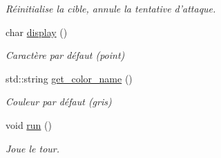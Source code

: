\begin{DoxyCompactItemize}
\begin{DoxyCompactList}\small\item\em Réinitialise la cible, annule la tentative d'attaque. \end{DoxyCompactList}\item 
\hypertarget{classColonized__planet_a1d3897c8ef1772fa9908fee7c5830f77}{char \hyperlink{classColonized__planet_a1d3897c8ef1772fa9908fee7c5830f77}{display} ()}\label{classColonized__planet_a1d3897c8ef1772fa9908fee7c5830f77}

\begin{DoxyCompactList}\small\item\em Caractère par défaut (point) \end{DoxyCompactList}\item 
\hypertarget{classColonized__planet_af8e3c6d3e72bf80b2e44013ceba2087f}{std\-::string \hyperlink{classColonized__planet_af8e3c6d3e72bf80b2e44013ceba2087f}{get\-\_\-color\-\_\-name} ()}\label{classColonized__planet_af8e3c6d3e72bf80b2e44013ceba2087f}

\begin{DoxyCompactList}\small\item\em Couleur par défaut (gris) \end{DoxyCompactList}\item 
void \hyperlink{classColonized__planet_ab8d7c5d4c58fed9239277f18b9de174a}{run} ()
\begin{DoxyCompactList}\small\item\em Joue le tour. \end{DoxyCompactList}\end{DoxyCompactItemize}
